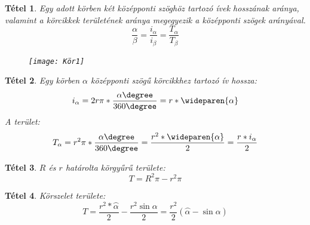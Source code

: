 \documentclass[twoside,12pt]{report}
\newtheorem{theorem}{Tétel}[section]
\theoremstyle{definition}
\begin{document}
	\begin{theorem}
		Egy adott körben két középponti szöghöz tartozó ívek hosszának aránya, valamint a körcikkek
		területének aránya megegyezik a középponti szögek arányával.
		\begin{equation*}
			\frac{\alpha}{\beta}=\frac{i_\alpha}{i_\beta}=\frac{T_\alpha}{T_\beta}
		\end{equation*}
		\begin{figure}[H]
			\centering
			\texttt{[image: Kör1]}
		\end{figure}
	\end{theorem}
	\begin{theorem}
		Egy körben $\alpha$ középponti szögű körcikkhez tartozó ív hossza:
		\begin{equation*}
			i_\alpha=2r\pi*\frac{\alpha\degree}{360\degree}=r*\wideparen{\alpha}
		\end{equation*}
		A terület:
		\begin{equation*}
			T_\alpha=r^2\pi*\frac{\alpha\degree}{360\degree}=\frac{r^2*\wideparen{\alpha}}{2}=\frac{r*i_\alpha}{2}
		\end{equation*}
	\end{theorem}
	\begin{theorem}
		$R$ és $r$ határolta körgyűrű területe:
		\begin{equation*}
			T=R^2\pi-r^2\pi
		\end{equation*}
	\end{theorem}
	\begin{theorem}
		Körszelet területe:
		\begin{equation*}
			T=\frac{r^2*\wideparen{\alpha}}{2}-\frac{r^2\sin\alpha}{2}=\frac{r^2}{2}\left(\wideparen{\alpha}-\sin\alpha\right)
		\end{equation*}
	\end{theorem}
\end{document}
